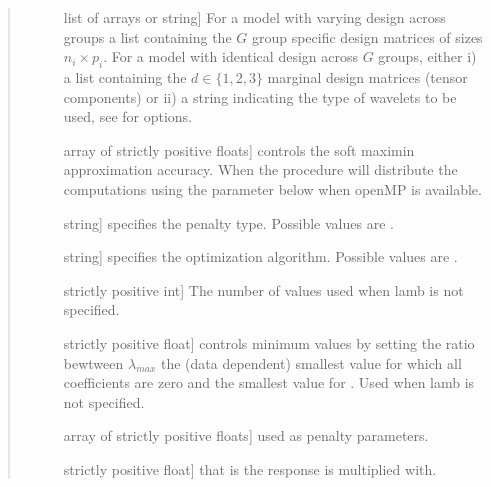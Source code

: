 \documentclass[letterpaper,10pt,english]{sphinxmanual}
\begin{document}
\begin{fulllineitems}
\begin{quote}
\begin{description}
\begin{description}
\item[{}] \leavevmode{[}list of arrays or string{]}
\sphinxAtStartPar
For a model with varying design across groups a list containing the 
\(G\) group specific design matrices of sizes \(n_i \times p_i\).  
For a model with identical design across \(G\) groups, either i) a list containing the 
\(d \in \{ 1, 2, 3\}\) marginal design matrices (tensor components) or ii) 
a string indicating the type of wavelets to be used, see  for options.

\item[{}] \leavevmode{[}array of strictly positive floats{]}
\sphinxAtStartPar
controls  the soft maximin approximation accuracy. When  
the procedure will distribute
the computations using the    parameter below when openMP is available.

\item[{}] \leavevmode{[}string{]}
\sphinxAtStartPar
specifies the penalty type. Possible values are .

\item[{}] \leavevmode{[}string{]}
\sphinxAtStartPar
specifies the optimization algorithm. Possible values are .

\item[{}] \leavevmode{[}strictly positive int{]}
\sphinxAtStartPar
The number of  values used when lamb is not specified.

\item[{}] \leavevmode{[}strictly positive float{]}
\sphinxAtStartPar
controls minimum  values by setting the ratio bewtween 
\(\lambda_{max}\) \textendash{} the (data dependent) smallest value for which all 
coefficients are zero \textendash{}  and the smallest value for .
Used when lamb is not specified.

\item[{}] \leavevmode{[}array of strictly positive floats{]}
\sphinxAtStartPar
used  as penalty parameters.

\item[{}] \leavevmode{[}strictly positive float{]}
\sphinxAtStartPar
that is the response    is multiplied with.


\end{description}
\end{description}
\end{quote}
\end{fulllineitems}
\end{document}
